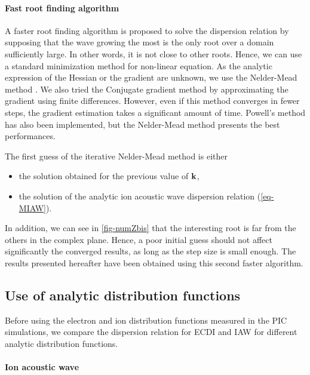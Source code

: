   \paragraph{Fast root finding algorithm\\}
    A faster root finding algorithm is proposed to solve the dispersion relation by supposing that the wave growing the most is the only root over a domain sufficiently large.
    In other words, it is not close to other roots.
    Hence, we can use a standard minimization method for non-linear equation.
    As the analytic expression of the Hessian or the gradient are unknown, we use the Nelder-Mead method \citep{mckinnon1998}.
    We also tried the Conjugate gradient method by approximating the gradient using finite differences. 
    However, even if this method converges in fewer steps, the gradient estimation takes a significant amount of time.
    Powell's method \citep{powell1964} has also been implemented, but the Nelder-Mead method presents the best performances.
    
    The first guess of the iterative Nelder-Mead method is either 
    \begin{itemize}
      \item the solution obtained for the previous value of ${\mathbf k}$, 
      \item the solution of the analytic ion acoustic wave dispersion relation (\cref{eq-MIAW}).
    \end{itemize}
    In addition, we can see in \cref{fig-numZbis} that the interesting root is far from the others in the complex plane.
    Hence, a poor initial guess should not affect significantly the converged results, as long as the step size is small enough.
    The results presented hereafter have been obtained using this second faster algorithm.
    

    \FloatBarrier

\subsection{Use of analytic distribution functions} \label{subsec-DRimpact}
  Before using the electron and ion distribution functions measured in the \ac{PIC} simulations, we compare the dispersion relation for \ac{ECDI} and \ac{IAW} for different analytic distribution functions.
  
  \paragraph{Ion acoustic wave\\}
  
